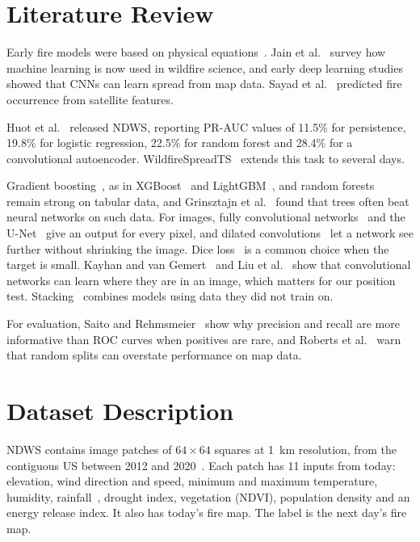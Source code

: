 \documentclass[conference]{IEEEtran}
\begin{document}
\section{Literature Review}
Early fire models were based on physical equations~\cite{rothermel1972,finney1998farsite}. Jain et al.~\cite{jain2020review} survey how machine learning is now used in wildfire science, and early deep learning studies~\cite{radke2019firecast,hodges2019cnn} showed that CNNs can learn spread from map data. Sayad et al.~\cite{sayad2019predictive} predicted fire occurrence from satellite features.

Huot et al.~\cite{huot2022ndws} released NDWS, reporting PR-AUC values of 11.5\% for persistence, 19.8\% for logistic regression, 22.5\% for random forest and 28.4\% for a convolutional autoencoder. WildfireSpreadTS~\cite{gerard2023wildfirespreadts} extends this task to several days.

Gradient boosting~\cite{friedman2001gbm}, as in XGBoost~\cite{chen2016xgboost} and LightGBM~\cite{ke2017lightgbm}, and random forests~\cite{breiman2001rf} remain strong on tabular data, and Grinsztajn et al.~\cite{grinsztajn2022tabular} found that trees often beat neural networks on such data. For images, fully convolutional networks~\cite{long2015fcn} and the U-Net~\cite{ronneberger2015unet} give an output for every pixel, and dilated convolutions~\cite{yu2016dilated} let a network see further without shrinking the image. Dice loss~\cite{milletari2016vnet} is a common choice when the target is small. Kayhan and van Gemert~\cite{kayhan2020translation} and Liu et al.~\cite{liu2018coordconv} show that convolutional networks can learn where they are in an image, which matters for our position test. Stacking~\cite{wolpert1992stacking} combines models using data they did not train on.

For evaluation, Saito and Rehmsmeier~\cite{saito2015pr} show why precision and recall are more informative than ROC curves when positives are rare, and Roberts et al.~\cite{roberts2017cv} warn that random splits can overstate performance on map data.

\section{Dataset Description}
NDWS contains \rPatches{} image patches of $64\times64$ squares at \SI{1}{km} resolution, from the contiguous US between 2012 and 2020~\cite{huot2022ndws}. Each patch has 11 inputs from today: elevation, wind direction and speed, minimum and maximum temperature, humidity, rainfall~\cite{abatzoglou2013gridmet}, drought index, vegetation (NDVI), population density and an energy release index. It also has today's fire map. The label is the next day's fire map.
\end{document}

